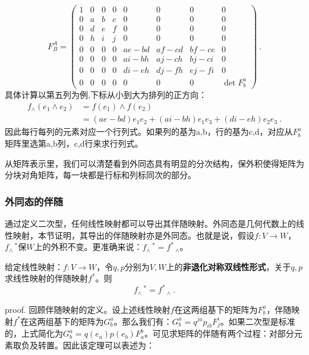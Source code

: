 \begin{equation}
F_B^A=\left(\begin{array}{cccccccc}
1 & 0 & 0 & 0 & 0 & 0 & 0 & 0 \\
0 & a & b & c & 0 & 0 & 0 & 0 \\
0 & d & e & f & 0 & 0 & 0 & 0 \\
0 & h & i & j & 0 & 0 & 0 & 0 \\
0 & 0 & 0 & 0 & a e-b d & a f-c d & b f-c e & 0 \\
0 & 0 & 0 & 0 & a i-b h & a j-c h & b j-c i & 0 \\
0 & 0 & 0 & 0 & d i-e h & d j-f h & e j-f i & 0 \\
0 & 0 & 0 & 0 & 0 & 0 & 0 & \operatorname{det} F_b^a
\end{array}\right) ~.
\end{equation}
具体计算以第五列为例,下标从小到大为排列的正方向：
\begin{equation}
\begin{aligned}
f_\wedge(e_1\wedge e_2)&=f(e_1)\wedge f(e_2)\\
&=(a e-b d)e_1 e_2+(a i-b h)e_1 e_3+ (d i-e h)e_2 e_3~.
\end{aligned}
\end{equation}
因此每行每列的元素对应一个行列式。如果列的基为a,b，行的基为c,d，对应从$F^a_b$矩阵里选第a,b列，c,d行来求行列式。

从矩阵表示里，我们可以清楚看到外同态具有明显的分次结构，保外积使得矩阵为分块对角矩阵，每一块都是行标和列标同次的部分。
\subsubsection{外同态的伴随}
通过定义二次型，任何线性映射都可以导出其伴随映射。外同态是几何代数上的线性映射，本节证明，其导出的伴随映射亦是外同态。也就是说，假设$f:V\rightarrow W$，$f_{\wedge}\,^*$保$W$上的外积不变。更准确来说：$f_{\wedge}\,^*=f^*\,_{\wedge}$。

\begin{theorem}{}
给定线性映射：$f:V\rightarrow W$，令$q,p$分别为$V,W$上的\textbf{非退化对称双线性形式}，关于$q,p$求线性映射的伴随映射$f^*$。则
\begin{equation}
f_{\wedge}\,^*=f^*\,_{\wedge}~.
\end{equation}
\end{theorem}
proof.
回顾伴随映射的定义。设上述线性映射$f$在这两组基下的矩阵为$F^a_b$，伴随映射$f^*$在这两组基下的矩阵为$G^a_b$。那么我们有：$G^a_b =q^{ja}p_{ib}F^i_j$。如果二次型是标准的，上式简化为$G^a_b=q(e_a)p(e_b)F^b_a$。可见求矩阵的伴随有两个过程：对部分元素取负及转置。因此该定理可以表述为：

